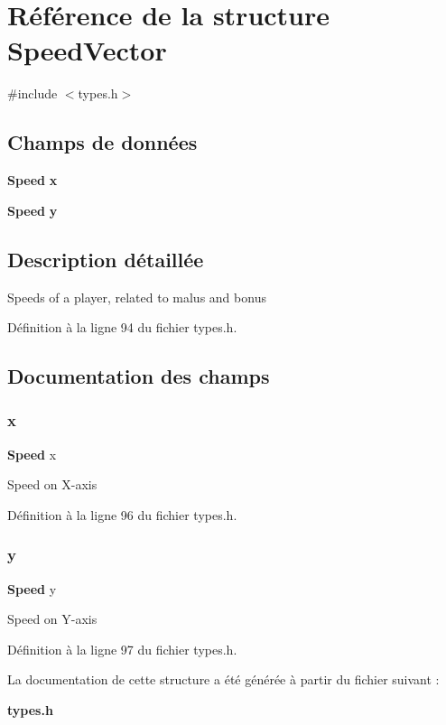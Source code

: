 \section{Référence de la structure Speed\+Vector}
\label{struct_speed_vector}


{\ttfamily \#include $<$types.\+h$>$}

\subsection*{Champs de données}
\begin{DoxyCompactItemize}
\item 
\textbf{ Speed} \textbf{ x}
\item 
\textbf{ Speed} \textbf{ y}
\end{DoxyCompactItemize}


\subsection{Description détaillée}
Speeds of a player, related to malus and bonus 

Définition à la ligne 94 du fichier types.\+h.



\subsection{Documentation des champs}
\mbox{\label{struct_speed_vector_a6eb82865dfa8817d407ad66fd781a231}} 
\subsubsection{x}
{\footnotesize\ttfamily \textbf{ Speed} x}

Speed on X-\/axis 

Définition à la ligne 96 du fichier types.\+h.

\mbox{\label{struct_speed_vector_a4850d889ee6534fb9a0974232d123827}} 
\subsubsection{y}
{\footnotesize\ttfamily \textbf{ Speed} y}

Speed on Y-\/axis 

Définition à la ligne 97 du fichier types.\+h.



La documentation de cette structure a été générée à partir du fichier suivant \+:\begin{DoxyCompactItemize}
\item 
\textbf{ types.\+h}\end{DoxyCompactItemize}
